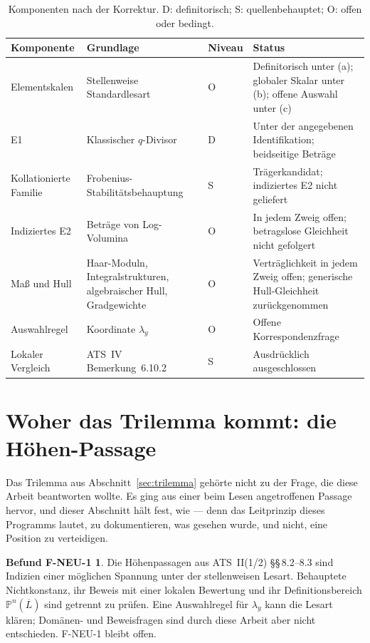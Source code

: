 \documentclass[11pt,a4paper]{article}
\theoremstyle{definition}
\theoremstyle{plain}
\theoremstyle{definition}
\newtheorem*{findingF}{Befund F-NEU-1}
\begin{document}
\begin{table}[htbp]
\centering
\caption{Komponenten nach der Korrektur. D: definitorisch; S: quellenbehauptet;
O: offen oder bedingt.}
\label{tab:resolution}
\small
\begin{tabular}{@{}P{0.23\textwidth}P{0.27\textwidth}P{0.08\textwidth}P{0.29\textwidth}@{}}
\toprule
Komponente & Grundlage & Niveau & Status \\
\midrule
Elementskalen & Stellenweise Standardlesart & O
 & Definitorisch unter (a); globaler Skalar unter (b); offene Auswahl unter (c) \\[3pt]
E1 & Klassischer $q$-Divisor & D
 & Unter der angegebenen Identifikation; beidseitige Beträge \\[3pt]
Kollationierte Familie & Frobenius-Stabilitätsbehauptung & S
 & Trägerkandidat; indiziertes E2 nicht geliefert \\[3pt]
Indiziertes E2 & Beträge von Log-Volumina & O
 & In jedem Zweig offen; betragslose Gleichheit nicht gefolgert \\[3pt]
Maß und Hull & Haar-Moduln, Integralstrukturen, algebraischer Hull, Gradgewichte & O
 & Verträglichkeit in jedem Zweig offen; generische Hull-Gleichheit zurückgenommen \\[3pt]
Auswahlregel & Koordinate $\lambda_y$ & O
 & Offene Korrespondenzfrage \\[3pt]
Lokaler Vergleich & ATS~IV Bemerkung~6.10.2 & S
 & Ausdrücklich ausgeschlossen \\
\bottomrule
\end{tabular}
\end{table}

\section{Woher das Trilemma kommt: die Höhen-Passage}
\label{sec:fneu}

Das Trilemma aus Abschnitt~\ref{sec:trilemma} gehörte nicht zu der Frage, die diese
Arbeit beantworten wollte. Es ging aus einer beim Lesen angetroffenen Passage
hervor, und dieser Abschnitt hält fest, wie --- denn das Leitprinzip dieses
Programms lautet, zu dokumentieren, was gesehen wurde, und nicht, eine Position zu
verteidigen.

\begin{findingF}
Die Höhenpassagen aus ATS~II(1/2) \S\S\,8.2--8.3 sind Indizien einer
möglichen Spannung unter der stellenweisen Lesart. Behauptete Nichtkonstanz,
ihr Beweis mit einer lokalen Bewertung und ihr Definitionsbereich
$\mathbb P^n(\overline L)$ sind getrennt zu prüfen.
Eine Auswahlregel für $\lambda_y$ kann die Lesart klären; Domänen- und
Beweisfragen sind durch diese Arbeit aber nicht entschieden.
F-NEU-1 bleibt offen.
\end{findingF}
\end{document}
